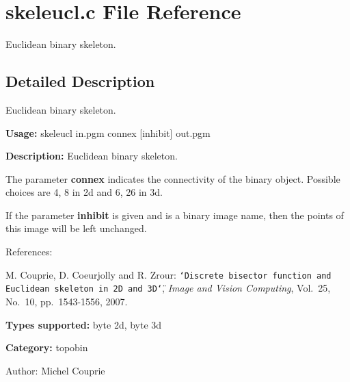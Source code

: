 \section{skeleucl.c File Reference}
\label{skeleucl_8c}
Euclidean binary skeleton. 



\subsection{Detailed Description}
Euclidean binary skeleton. 

{\bf Usage:} skeleucl in.pgm connex [inhibit] out.pgm

{\bf Description:} Euclidean binary skeleton.

The parameter {\bf connex} indicates the connectivity of the binary object. Possible choices are 4, 8 in 2d and 6, 26 in 3d.

If the parameter {\bf inhibit} is given and is a binary image name, then the points of this image will be left unchanged.

References:\par
 [CCZ07] M. Couprie, D. Coeurjolly and R. Zrour: {\tt \char`\"{}Discrete bisector function and Euclidean skeleton in 2D and 3D\char`\"{}}, {\em Image and Vision Computing\/}, Vol.~25, No.~10, pp.~1543-1556, 2007.\par


{\bf Types supported:} byte 2d, byte 3d

{\bf Category:} topobin

\begin{Desc}
\item[Author:]Michel Couprie \end{Desc}
